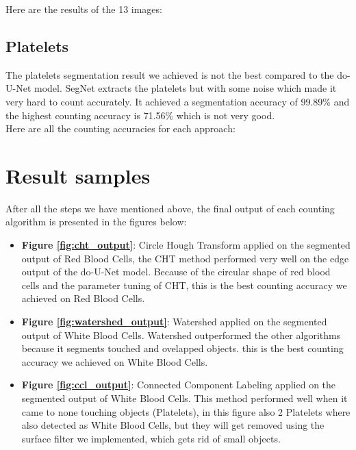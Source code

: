 Here are the results of the 13 images:



\subsection{Platelets}
\hspace{\parindent}
The platelets segmentation result we achieved is not the best compared to the do-U-Net model. SegNet extracts the platelets but with some noise which made it very hard to count accurately.
It achieved a segmentation accuracy of 99.89\% and the highest counting accuracy is 71.56\% which is not very good.\\
Here are all the counting accuracies for each approach:



\section{Result samples}
\vspace{0.2in}
\hspace{\parindent}
After all the steps we have mentioned above, the final output of each counting algorithm is presented in the figures below:

\begin{itemize}
  \item \textbf{Figure \ref{fig:cht_output}}: Circle Hough Transform applied on the segmented output of Red Blood Cells, the CHT method performed very well on the edge output of the do-U-Net model.
    Because of the circular shape of red blood cells and the parameter tuning of CHT, this is the best counting accuracy we achieved on Red Blood Cells.
  \item \textbf{Figure \ref{fig:watershed_output}}: Watershed applied on the segmented output of White Blood Cells. Watershed outperformed the other algorithms because it segments touched and ovelapped objects. this is the best counting accuracy we achieved on White Blood Cells.
  \item \textbf{Figure \ref{fig:ccl_output}}: Connected Component Labeling applied on the segmented output of White Blood Cells. This method performed well when it came to none touching objects (Platelets), in this figure also 2 Platelets where also detected as White Blood Cells, but they will get removed using the surface filter we implemented, which gets rid of small objects.
\end{itemize}

